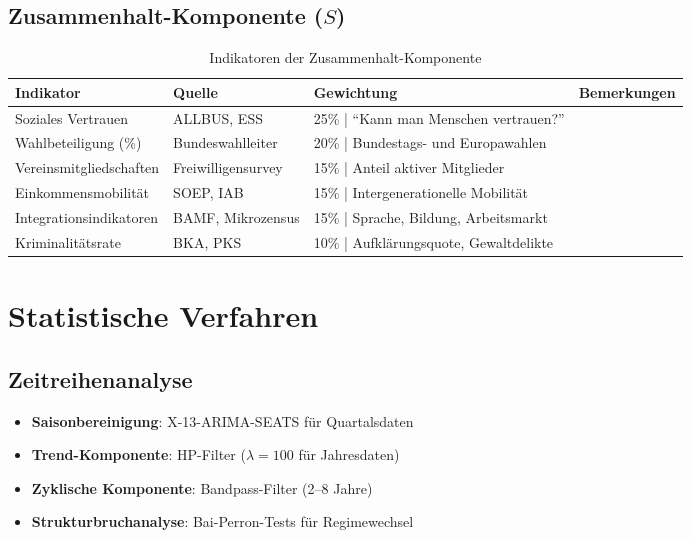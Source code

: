 \subsection{Zusammenhalt-Komponente (\(S\))}

\begin{table}[ht]
    \centering
    \caption{Indikatoren der Zusammenhalt-Komponente}
    \label{tab:indikatoren_zusammenhalt}
    \begin{tabular}{llll}
        \toprule
        \textbf{Indikator} & \textbf{Quelle} & \textbf{Gewichtung} & \textbf{Bemerkungen} \\
        \midrule
        Soziales Vertrauen & ALLBUS, ESS & 25\% | \enquote{Kann man Menschen vertrauen?} \\
        Wahlbeteiligung (\%) & Bundeswahlleiter & 20\% | Bundestags- und Europawahlen \\
        Vereinsmitgliedschaften & Freiwilligensurvey & 15\% | Anteil aktiver Mitglieder \\
        Einkommensmobilität & SOEP, IAB & 15\% | Intergenerationelle Mobilität \\
        Integrationsindikatoren & BAMF, Mikrozensus & 15\% | Sprache, Bildung, Arbeitsmarkt \\
        Kriminalitätsrate & BKA, PKS & 10\% | Aufklärungsquote, Gewaltdelikte \\
        \bottomrule
    \end{tabular}
\end{table}

\section{Statistische Verfahren}

\subsection{Zeitreihenanalyse}

\begin{itemize}
    \item \textbf{Saisonbereinigung}: X-13-ARIMA-SEATS für Quartalsdaten
    \item \textbf{Trend-Komponente}: HP-Filter (\(\lambda = 100\) für Jahresdaten)
    \item \textbf{Zyklische Komponente}: Bandpass-Filter (2–8 Jahre)
    \item \textbf{Strukturbruchanalyse}: Bai-Perron-Tests für Regimewechsel
\end{itemize}

